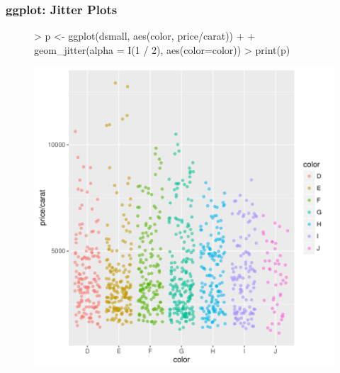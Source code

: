 \documentclass{beamer}
\begin{document}
\begin{frame}[containsverbatim]  
	\frametitle{ggplot: Jitter Plots}
\scriptsize 
\begin{figure}
  \centering
\begin{Schunk}
\begin{Sinput}
> p <- ggplot(dsmall, aes(color, price/carat)) + 
+             geom_jitter(alpha = I(1 / 2), aes(color=color))
> print(p) 
\end{Sinput}
\end{Schunk}
\includegraphics{fig--067}
\label{fig:qplotscatter}
\end{figure}
\end{frame}
\end{document}
